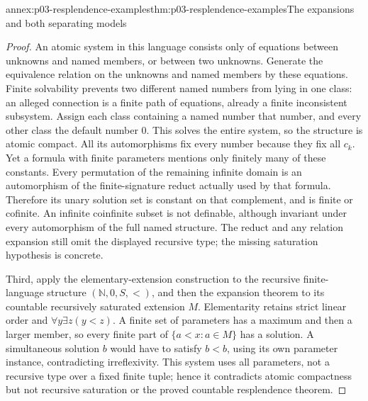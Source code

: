 \begin{annexitem}{annex:p03-resplendence-examples}{thm:p03-resplendence-examples}{The expansions and both separating models}
\begin{proof}
An atomic system in this language consists only of equations between
unknowns and named members, or between two unknowns. Generate the
equivalence relation on the unknowns and named members by these equations.
Finite solvability prevents two different named numbers from lying in
one class: an alleged connection is a finite path of equations, already
a finite inconsistent subsystem. Assign each class containing a named
number that number, and every other class the default number \(0\).
This solves the entire system, so the structure is atomic compact.
All its automorphisms fix every number because they fix all \(c_k\).
Yet a formula with finite parameters mentions only finitely many of
these constants. Every permutation of the remaining infinite domain is
an automorphism of the finite-signature reduct actually used by that
formula. Therefore its unary solution set is constant on that complement,
and is finite or cofinite. An infinite coinfinite subset is not definable,
although invariant under every automorphism of the full named structure.
The reduct and any relation expansion still omit the displayed recursive
type; the missing saturation hypothesis is concrete.

Third, apply the elementary-extension construction to the recursive
finite-language structure \((\mathbb N,0,S,<)\), and then the expansion
theorem to its countable recursively saturated extension \(M\).
Elementarity retains strict linear order and
\(\forall y\exists z(y<z)\). A finite set of parameters has a maximum
and then a larger member, so every finite part of \(\{a<x:a\in M\}\)
has a solution. A simultaneous solution \(b\) would have to satisfy
\(b<b\), using its own parameter instance, contradicting irreflexivity.
This system uses all parameters, not a recursive type over a fixed finite
tuple; hence it contradicts atomic compactness but not recursive saturation
or the proved countable resplendence theorem.
\end{proof}
\end{annexitem}
